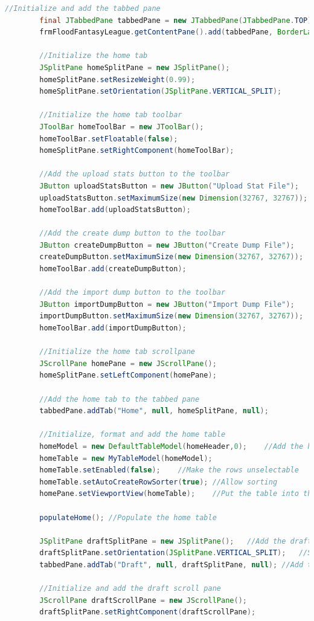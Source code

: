 \documentclass[12pt]{report}
\begin{document}
\begin{singlespace}
\begin{lstlisting}[language=Java,label=some-code,caption={GUI.java}]
		//Initialize and add the tabbed pane
		final JTabbedPane tabbedPane = new JTabbedPane(JTabbedPane.TOP);
		frmFloodFantasyLeague.getContentPane().add(tabbedPane, BorderLayout.CENTER);
		
		//Initialize the home tab
		JSplitPane homeSplitPane = new JSplitPane();
		homeSplitPane.setResizeWeight(0.99);
		homeSplitPane.setOrientation(JSplitPane.VERTICAL_SPLIT);
		
		//Initialize the home tab toolbar
		JToolBar homeToolBar = new JToolBar();
		homeToolBar.setFloatable(false);
		homeSplitPane.setRightComponent(homeToolBar);
		
		//Add the upload stats button to the toolbar
		JButton uploadStatsButton = new JButton("Upload Stat File");
		uploadStatsButton.setMaximumSize(new Dimension(32767, 32767));
		homeToolBar.add(uploadStatsButton);
		
		//Add the create dump button to the toolbar
		JButton createDumpButton = new JButton("Create Dump File");
		createDumpButton.setMaximumSize(new Dimension(32767, 32767));
		homeToolBar.add(createDumpButton);
		
		//Add the import dump button to the toolbar
		JButton importDumpButton = new JButton("Import Dump File");
		importDumpButton.setMaximumSize(new Dimension(32767, 32767));
		homeToolBar.add(importDumpButton);
		
		//Initialize the home tab scrollpane
		JScrollPane homePane = new JScrollPane();
		homeSplitPane.setLeftComponent(homePane);
		
		//Add the home tab to the tabbed pane
		tabbedPane.addTab("Home", null, homeSplitPane, null);
		
		//Initialize, format and add the home table
		homeModel = new DefaultTableModel(homeHeader,0);	//Add the header but no rows
		homeTable = new MyTableModel(homeModel);
		homeTable.setEnabled(false);	//Make the rows unselectable
		homeTable.setAutoCreateRowSorter(true);	//Allow sorting
		homePane.setViewportView(homeTable);	//Put the table into the scroll pane
		
		populateHome();	//Populate the home table
		
		JSplitPane draftSplitPane = new JSplitPane();	//Add the draft split pane
		draftSplitPane.setOrientation(JSplitPane.VERTICAL_SPLIT);	//Split vertically
		tabbedPane.addTab("Draft", null, draftSplitPane, null);	//Add the split pane to the tabbed pane
		
		//Initialize and add the draft scroll pane
		JScrollPane draftScrollPane = new JScrollPane();
		draftSplitPane.setRightComponent(draftScrollPane);
		

\end{lstlisting}
\end{singlespace}
\end{document}
